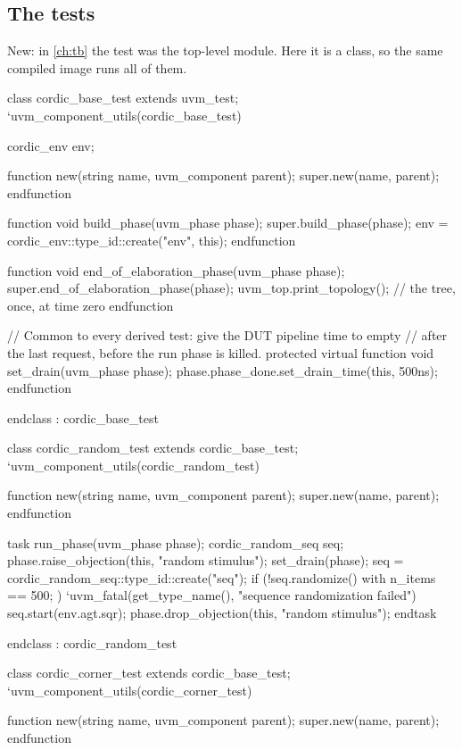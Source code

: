 \subsection{The tests}

New: in \cref{ch:tb} the test was the top-level module. Here it is a class,
so the same compiled image runs all of them.

\begin{uvmcode}[caption={A base test and two derived tests},label={lst:uvm:test}]
  class cordic_base_test extends uvm_test;
    `uvm_component_utils(cordic_base_test)

    cordic_env env;

    function new(string name, uvm_component parent);
      super.new(name, parent);
    endfunction

    function void build_phase(uvm_phase phase);
      super.build_phase(phase);
      env = cordic_env::type_id::create("env", this);
    endfunction

    function void end_of_elaboration_phase(uvm_phase phase);
      super.end_of_elaboration_phase(phase);
      uvm_top.print_topology();      // the tree, once, at time zero
    endfunction

    // Common to every derived test: give the DUT pipeline time to empty
    // after the last request, before the run phase is killed.
    protected virtual function void set_drain(uvm_phase phase);
      phase.phase_done.set_drain_time(this, 500ns);
    endfunction

  endclass : cordic_base_test


  class cordic_random_test extends cordic_base_test;
    `uvm_component_utils(cordic_random_test)

    function new(string name, uvm_component parent);
      super.new(name, parent);
    endfunction

    task run_phase(uvm_phase phase);
      cordic_random_seq seq;
      phase.raise_objection(this, "random stimulus");
      set_drain(phase);
      seq = cordic_random_seq::type_id::create("seq");
      if (!seq.randomize() with { n_items == 500; })
        `uvm_fatal(get_type_name(), "sequence randomization failed")
      seq.start(env.agt.sqr);
      phase.drop_objection(this, "random stimulus");
    endtask

  endclass : cordic_random_test


  class cordic_corner_test extends cordic_base_test;
    `uvm_component_utils(cordic_corner_test)

    function new(string name, uvm_component parent);
      super.new(name, parent);
    endfunction


\end{uvmcode}
